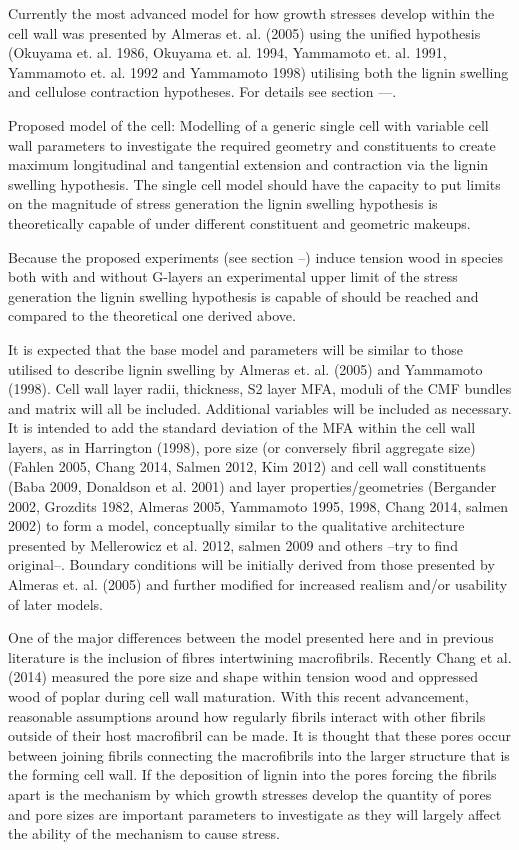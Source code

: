 \documentclass{article}
\begin{document}
Currently the most advanced model for how growth stresses develop within the
cell wall was presented by Almeras et. al. (2005) using the unified hypothesis
(Okuyama et. al. 1986, Okuyama et. al. 1994, Yammamoto et. al. 1991, Yammamoto
et. al. 1992 and Yammamoto 1998) utilising both the lignin swelling and
cellulose contraction hypotheses. For details see section ---.

Proposed model of the cell:
Modelling of a generic single cell with variable cell wall parameters to
investigate the required geometry and constituents to create maximum
longitudinal and tangential extension and contraction via the lignin swelling
hypothesis. The single cell model should have the capacity to put limits on the
magnitude of stress generation the lignin swelling hypothesis is theoretically
capable of under different constituent and geometric makeups.

Because the proposed experiments (see section --) induce tension wood in species
both with and without G-layers an experimental upper limit of the stress
generation the lignin swelling hypothesis is capable of should be reached and
compared to the theoretical one derived above.

It is expected that the base model and parameters will be similar to those
utilised to describe lignin swelling by Almeras  et. al. (2005) and Yammamoto
(1998). Cell wall layer radii, thickness, S2 layer MFA, moduli of the CMF
bundles and matrix will all be included. Additional variables will be included
as necessary. It is intended to add the standard deviation of the MFA within the
cell wall layers, as in Harrington (1998), pore size (or conversely fibril
aggregate size) (Fahlen 2005, Chang 2014, Salmen 2012, Kim 2012) and cell wall
constituents (Baba 2009, Donaldson et al. 2001) and layer properties/geometries
(Bergander 2002, Grozdits 1982, Almeras 2005, Yammamoto 1995, 1998, Chang 2014,
salmen 2002) to form a model, conceptually similar to the qualitative
architecture presented by Mellerowicz et al. 2012, salmen 2009 and others --try
to find original--. Boundary conditions will be initially derived from those
presented by Almeras et. al. (2005) and further modified for increased realism
and/or usability of later models.

One of the major differences between the model presented here and in previous
literature is the inclusion of fibres intertwining macrofibrils. Recently Chang
et al. (2014) measured the pore size and shape within tension wood and oppressed
wood of poplar during cell wall maturation. With this recent advancement,
reasonable assumptions around how regularly fibrils interact with other fibrils
outside of their host macrofibril can be made. It is thought that these pores
occur between joining fibrils connecting the macrofibrils into the larger
structure that is the forming cell wall. If the deposition of lignin into the
pores forcing the fibrils apart is the mechanism by which growth stresses
develop the quantity of pores and pore sizes are important parameters to
investigate as they will largely affect the ability of the mechanism to cause
stress.
\end{document}
